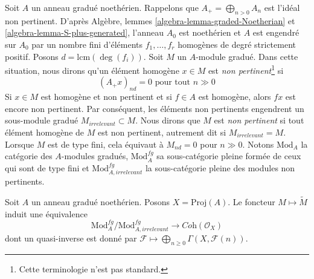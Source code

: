 \noindent
Soit $A$ un anneau gradué noethérien. Rappelons que
$A_+ = \bigoplus_{n > 0} A_n$ est l'idéal non pertinent.
D'après Algèbre, lemmes \ref{algebra-lemma-graded-Noetherian} et
\ref{algebra-lemma-S-plus-generated}, l'anneau $A_0$ est noethérien
et $A$ est engendré sur $A_0$ par un nombre fini d'éléments
$f_1, \ldots, f_r$ homogènes de degré strictement positif.
Posons $d = \text{lcm}(\deg(f_i))$. Soit $M$ un $A$-module
gradué. Dans cette situation, nous dirons qu'un élément homogène $x \in M$
est {\it non pertinent}\footnote{Cette terminologie n'est pas standard.} si
$$
(A_+ x)_{nd} = 0\text{ pour tout }n \gg 0
$$
Si $x \in M$ est homogène et non pertinent et si $f \in A$
est homogène, alors $fx$ est encore non pertinent.
Par conséquent, les éléments non pertinents engendrent un sous-module gradué
$M_{irrelevant} \subset M$. Nous dirons que $M$ est {\it non pertinent}
si tout élément homogène de $M$ est non pertinent, autrement
dit si $M_{irrelevant} = M$.
Lorsque $M$ est de type fini,
cela équivaut à $M_{nd} = 0$ pour $n \gg 0$.
Notons $\text{Mod}_A$ la catégorie des $A$-modules gradués,
$\text{Mod}^{fg}_A$ sa sous-catégorie pleine formée de ceux qui sont de type
fini et $\text{Mod}^{fg}_{A, irrelevant}$ la sous-catégorie pleine des modules
non pertinents.

\begin{proposition}
\label{proposition-coherent-modules-on-proj-general}
Soit $A$ un anneau gradué noethérien. Posons $X = \text{Proj}(A)$. Le foncteur
$M \mapsto \widetilde M$ induit une équivalence
$$
\text{Mod}^{fg}_A/\text{Mod}^{fg}_{A, irrelevant}
\longrightarrow
\textit{Coh}(\mathcal{O}_X)
$$
dont un quasi-inverse est donné par
$\mathcal{F} \longmapsto \bigoplus_{n \geq 0} \Gamma(X, \mathcal{F}(n))$.
\end{proposition}

